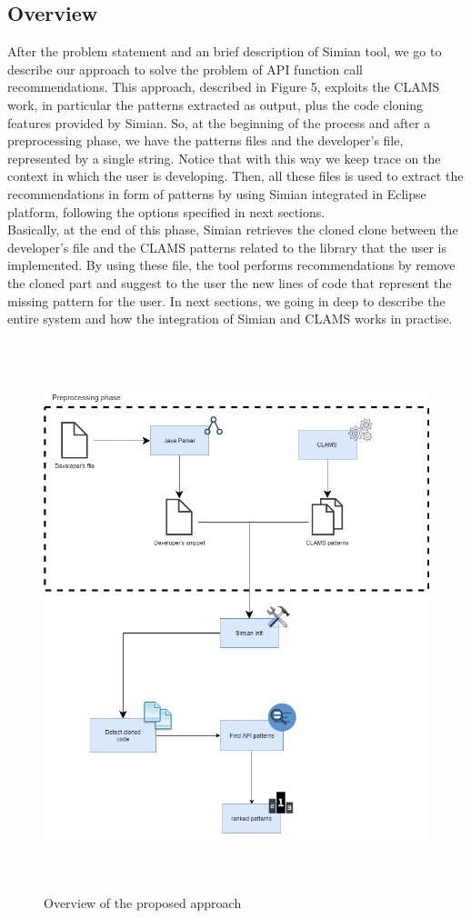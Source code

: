 
\subsection{Overview}
After the problem statement and an brief description of Simian tool, we go to describe our approach to solve the problem of API function call recommendations. This approach, described in Figure 5, exploits the CLAMS work, in particular the patterns extracted as output, plus the code cloning features provided by Simian. So, at the beginning of the process and after a preprocessing phase, we have the patterns files and the developer's file, represented by a single string. Notice that with this way we keep trace on the context in which the user is developing. Then, all these files is used to extract the recommendations in form of patterns by using Simian integrated in Eclipse platform, following the options specified in next sections. \\
Basically, at the end of this phase, Simian retrieves the cloned clone between the developer's file and the CLAMS patterns related to the library that the user is implemented. By using these file, the tool performs recommendations by remove the cloned part and suggest to the user the new lines of code that represent the missing pattern for the user. In next sections, we going in deep to describe the entire system and how the integration of Simian and CLAMS works in practise. 


\begin{figure}[H]
\includegraphics[width=14cm,height=16cm,keepaspectratio]{images/simian.png}
\centering
\caption{Overview of the proposed approach}
\label{Figure 5}
\end{figure}

